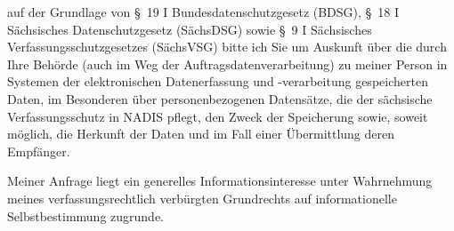 auf der Grundlage von §~19 I Bundesdatenschutzgesetz (BDSG),
§~18 I Sächsisches Datenschutzgesetz (SächsDSG) sowie
§~9 I Sächsisches Verfassungsschutzgesetzes (SächsVSG) bitte ich Sie um Auskunft
über die durch Ihre Behörde (auch im Weg der Auftragsdatenverarbeitung) zu meiner
Person in Systemen der elektronischen Datenerfassung und -verarbeitung gespeicherten
Daten, im Besonderen über personenbezogenen Datensätze, die der sächsische
Verfassungsschutz in NADIS pflegt, den Zweck der Speicherung sowie, soweit möglich,
die Herkunft der Daten und im Fall einer Übermittlung deren Empfänger.

Meiner Anfrage liegt ein generelles Informationsinteresse unter Wahrnehmung
meines verfassungsrechtlich verbürgten Grundrechts auf informationelle
Selbstbestimmung zugrunde.
